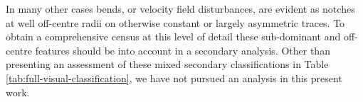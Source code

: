 In many other cases bends, or velocity field disturbances, are evident as notches at well off-centre radii on otherwise constant or largely asymmetric traces. To obtain a comprehensive census at this level of detail these sub-dominant and off-centre features should be into account in a secondary analysis. Other than presenting an  assessment of these mixed secondary classifications in Table \ref{tab:full-visual-classification}, we have not pursued an analysis in this present work.




